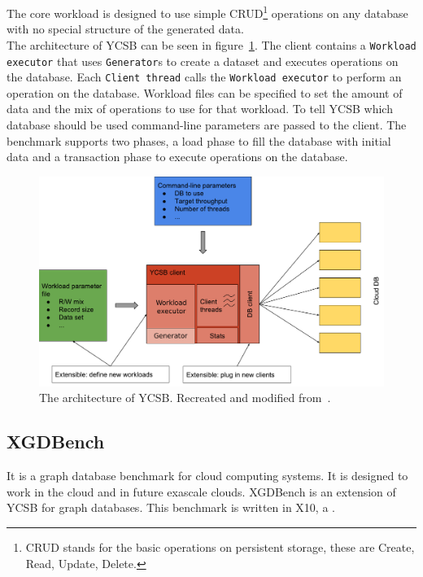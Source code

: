 The core workload is designed to use simple CRUD\footnote{CRUD stands for the basic operations on persistent storage,
these are Create, Read, Update, Delete.} operations on any database with no special structure of the generated data.\\
The architecture of YCSB can be seen in figure~\ref{fig:ycsbArchitecture}.
The client contains a \texttt{Workload executor} that uses \texttt{Generator}s to create a dataset and executes operations on the database.
Each \texttt{Client thread} calls the \texttt{Workload executor} to perform an operation on the database.
Workload files can be specified to set the amount of data and the mix of operations to use for that workload.
To tell YCSB which database should be used command-line parameters are passed to the client.
The benchmark supports two phases,
a load phase to fill the database with initial data and a transaction phase to execute operations on the database.

\begin{figure}[h!]
  \centering
  \includegraphics[width=\textwidth]{images/benchmarks/ycsbArchitecture}
  \caption{The architecture of YCSB. Recreated and modified from~\cite[25]{Abubakar2014}.}
  \label{fig:ycsbArchitecture}
\end{figure}

\subsection{XGDBench}
\label{ch:background:se:XGDBench}
It is a graph database benchmark for cloud computing systems.
It is designed to work in the cloud and in future exascale clouds.
XGDBench is an extension of YCSB for graph databases.
This benchmark is written in X10,
a .

